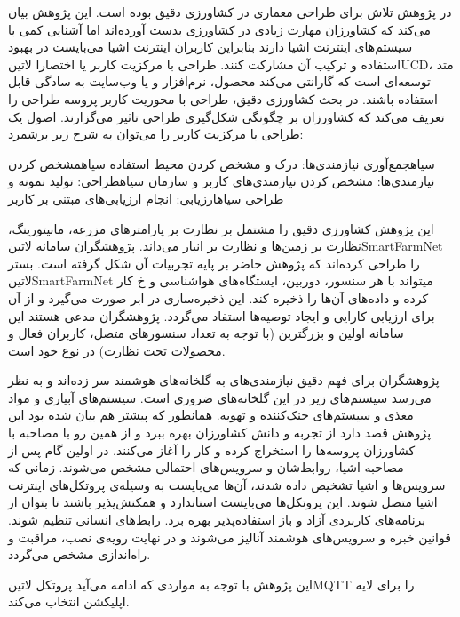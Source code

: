 
در پژوهش  تلاش برای طراحی معماری در کشاورزی دقیق بوده است. این پژوهش بیان می‌کند که کشاورزان مهارت زیادی در کشاورزی بدست آورده‌اند اما آشنایی کمی با سیستم‌های اینترنت اشیا دارند
بنابراین کاربران اینترنت اشیا می‌بایست در بهبود استفاده و ترکیب آن مشارکت کنند. طراحی با مرکزیت کاربر یا اختصارا ‌لاتین{UCD}، متد توسعه‌ای است که گارانتی می‌کند محصول، نرم‌افزار و یا وب‌سایت به سادگی قابل استفاده باشند.
در بحث کشاورزی دقیق، طراحی با محوریت کاربر پروسه طراحی را تعریف می‌کند که کشاورزان بر چگونگی شکل‌گیری طراحی تاثیر می‌گزارند. اصول یک طراحی با مرکزیت کاربر را می‌توان به شرح زیر برشمرد:

 ‌سیاه{جمع‌آوری نیازمندی‌ها}: درک و مشخص کردن محیط استفاده
 ‌سیاه{مشخص کردن نیازمندی‌ها}: مشخص کردن نیازمندی‌های کاربر و سازمان
 ‌سیاه{طراحی}: تولید نمونه و طراحی
 ‌سیاه{ارزیابی}: انجام ارزیابی‌های مبتنی بر کاربر

این پژوهش کشاورزی دقیق را مشتمل بر نظارت بر پارامترهای مزرعه، مانیتورینگ، نظارت بر زمین‌ها و نظارت بر انبار می‌داند. پژوهشگران سامانه ‌لاتین{SmartFarmNet} را طراحی کرده‌اند که پژوهش حاضر بر پایه تجربیات آن شکل گرفته است.
بستر ‌لاتین{SmartFarmNet} میتواند با هر سنسور، دوربین، ایستگاه‌های هواشناسی و ‌خ کار کرده و داده‌های آن‌ها را ذخیره کند. این ذخیره‌سازی در ابر صورت می‌گیرد و از آن برای ارزیابی کارایی و ایجاد توصیه‌ها استفاد می‌گردد.
پژوهشگران مدعی هستند این سامانه اولین و بزرگترین (با توجه به تعداد سنسورهای متصل، کاربران فعال و محصولات تحت نظارت) در نوع خود است.

پژوهشگران برای فهم دقیق نیازمندی‌های به گلخانه‌های هوشمند سر زده‌اند و به نظر می‌رسد سیستم‌های زیر در این گلخانه‌های ضروری است. سیستم‌های آبیاری و مواد مغذی و سیستم‌های خنک‌کننده و تهویه.
همانطور که پیشتر هم بیان شده بود این پژوهش قصد دارد از تجربه و دانش کشاورزان بهره ببرد و از همین رو با مصاحبه با کشاورزان پروسه‌ها را استخراج کرده و کار را آغاز می‌کنند.
در اولین گام پس از مصاحبه اشیا، روابط‌شان و سرویس‌های احتمالی مشخص می‌شوند. زمانی که سرویس‌ها و اشیا تشخیص داده شدند، آن‌ها می‌بایست به وسیله‌ی پروتکل‌های اینترنت اشیا متصل شوند.
این پروتکل‌ها می‌بایست استاندارد و همکنش‌پذیر باشند تا بتوان از برنامه‌های کاربردی آزاد و باز استفاده‌پذیر بهره برد.
رابط‌های انسانی تنظیم شوند.
قوانین خبره و سرویس‌های هوشمند آنالیز می‌شوند و در نهایت رویه‌ی نصب، مراقبت و راه‌اندازی مشخص می‌گردد.

این پژوهش با توجه به مواردی که ادامه می‌آید پروتکل ‌لاتین{MQTT} را برای لایه اپلیکشن انتخاب می‌کند.

